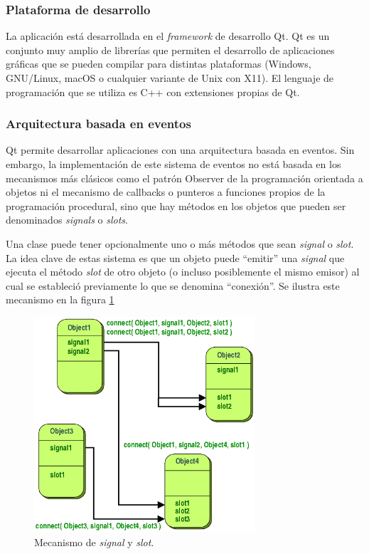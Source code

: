 \subsubsection{Plataforma de desarrollo}
La aplicación está desarrollada en el \emph{framework} de desarrollo Qt. Qt es un conjunto muy amplio de librerías que permiten el desarrollo de aplicaciones gráficas que se pueden compilar para distintas plataformas (Windows, GNU/Linux, macOS o cualquier variante de Unix con X11). El lenguaje de programación que se utiliza es C++ con extensiones propias de Qt.

\subsubsection{Arquitectura basada en eventos}\label{sec:qt}
Qt permite desarrollar aplicaciones con una arquitectura basada en eventos. Sin embargo, la implementación de este sistema de eventos no está basada en los mecanismos más clásicos como el patrón Observer de la programación orientada a objetos ni el mecanismo de callbacks o punteros a funciones propios de la programación procedural, sino que hay métodos en los objetos que pueden ser denominados \emph{signals} o \emph{slots}.

Una clase puede tener opcionalmente uno o más métodos que sean \emph{signal} o \emph{slot}. La idea clave de estas sistema es que un objeto puede \enquote{emitir} una \emph{signal} que ejecuta el método \emph{slot} de otro objeto (o incluso posiblemente el mismo emisor) al cual se estableció previamente lo que se denomina \enquote{conexión}. Se ilustra este mecanismo en la figura \ref{fig:signals-slots}

\begin{figure}[!ht]
	\centering
	\includegraphics[height=8cm]{imagenes/signal-slots.png}
	\caption{Mecanismo de \emph{signal} y \emph{slot}.}
	\label{fig:signals-slots}
\end{figure}

